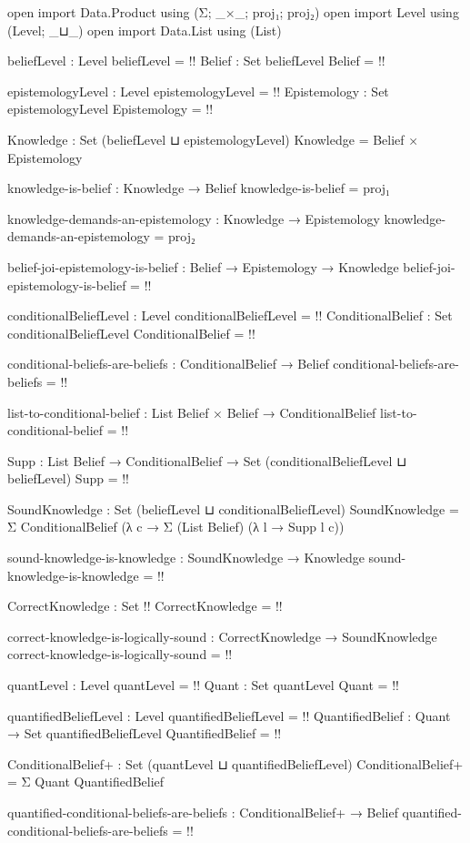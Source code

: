 \begin{code}
open import Data.Product using (Σ; _×_; proj₁; proj₂)
open import Level using (Level; _⊔_)
open import Data.List using (List)

beliefLevel : Level
beliefLevel = {!!}
Belief : Set beliefLevel
Belief = {!!}

epistemologyLevel : Level
epistemologyLevel = {!!}
Epistemology : Set epistemologyLevel
Epistemology = {!!}

Knowledge : Set (beliefLevel ⊔ epistemologyLevel)
Knowledge = Belief × Epistemology

knowledge-is-belief : Knowledge → Belief
knowledge-is-belief = proj₁

knowledge-demands-an-epistemology : Knowledge → Epistemology
knowledge-demands-an-epistemology = proj₂

belief-joi-epistemology-is-belief : Belief → Epistemology → Knowledge
belief-joi-epistemology-is-belief = {!!}

conditionalBeliefLevel : Level
conditionalBeliefLevel = {!!}
ConditionalBelief : Set conditionalBeliefLevel
ConditionalBelief = {!!}

conditional-beliefs-are-beliefs : ConditionalBelief → Belief
conditional-beliefs-are-beliefs = {!!}

list-to-conditional-belief : List Belief × Belief → ConditionalBelief
list-to-conditional-belief = {!!}

Supp : List Belief → ConditionalBelief → Set (conditionalBeliefLevel ⊔ beliefLevel)
Supp = {!!}

SoundKnowledge : Set (beliefLevel ⊔ conditionalBeliefLevel)
SoundKnowledge = Σ ConditionalBelief (λ c → Σ (List Belief) (λ l → Supp l c))

sound-knowledge-is-knowledge : SoundKnowledge → Knowledge
sound-knowledge-is-knowledge = {!!}

CorrectKnowledge : Set {!!}
CorrectKnowledge = {!!}

correct-knowledge-is-logically-sound : CorrectKnowledge → SoundKnowledge
correct-knowledge-is-logically-sound = {!!}

quantLevel : Level
quantLevel = {!!}
Quant : Set quantLevel
Quant = {!!}

quantifiedBeliefLevel : Level
quantifiedBeliefLevel = {!!}
QuantifiedBelief : Quant → Set quantifiedBeliefLevel
QuantifiedBelief = {!!}

ConditionalBelief+ : Set (quantLevel ⊔ quantifiedBeliefLevel)
ConditionalBelief+ = Σ Quant QuantifiedBelief

quantified-conditional-beliefs-are-beliefs : ConditionalBelief+ → Belief
quantified-conditional-beliefs-are-beliefs = {!!}
\end{code}
